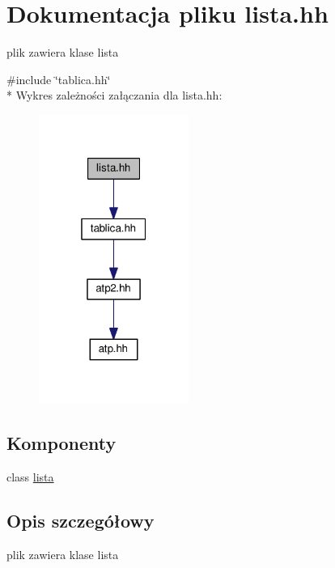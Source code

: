 \hypertarget{lista_8hh}{}\section{Dokumentacja pliku lista.\+hh}
\label{lista_8hh}


plik zawiera klase lista  


{\ttfamily \#include \char`\"{}tablica.\+hh\char`\"{}}\\*
Wykres zależności załączania dla lista.\+hh\+:\nopagebreak
\begin{figure}[H]
\begin{center}
\leavevmode
\includegraphics[width=139pt]{lista_8hh__incl}
\end{center}
\end{figure}
\subsection*{Komponenty}
\begin{DoxyCompactItemize}
\item 
class \hyperlink{classlista}{lista}
\end{DoxyCompactItemize}


\subsection{Opis szczegółowy}
plik zawiera klase lista 

